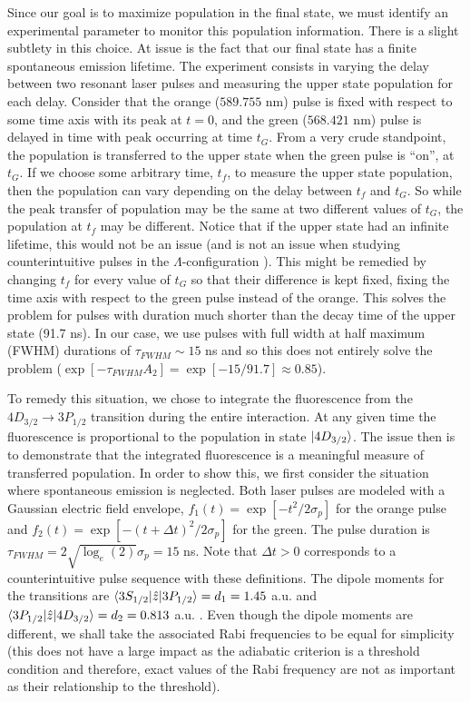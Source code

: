 Since our goal is to maximize population in the final state, we must identify
an experimental parameter to monitor this population information.  There
is a slight subtlety in this choice.  At issue is the fact that our
final state has a finite spontaneous emission lifetime.  The experiment consists
in varying the delay between two resonant laser pulses and measuring the upper
state population for each delay.  Consider that the orange
($589.755$ nm) pulse is fixed with respect to some time axis with its peak at
$t=0$, and the green ($568.421$ nm) pulse is delayed in time with peak occurring
at time $t_G$.  From a very crude standpoint, the population is transferred
to the upper state when the green pulse is ``on'', at $t_G$.  If we choose some
arbitrary time, $t_f$, to measure the upper state population, then
the population can vary depending on the delay between $t_f$ and $t_G$.  So
while the peak transfer of population may be the same at two different values
of $t_G$, the population at $t_f$ may be different.  Notice that if the upper
state had an infinite lifetime, this would not be an issue (and is not an issue
when studying counterintuitive pulses in the $\Lambda$-configuration
\cite{He:90}).  This might be remedied by changing $t_f$ for every value of
$t_G$ so that their difference is kept fixed, fixing the time axis with respect
to the green pulse instead of the orange.  This solves the problem for pulses
with duration much shorter than the decay time of the upper state (91.7 ns).  In
our case, we use pulses with full width at half maximum (FWHM) durations of
$\tau_{\scriptscriptstyle \!F\!W\!H\!M}
\sim 15$ ns and so this does not entirely solve the problem
($\exp[-\tau_{\scriptscriptstyle \!F\!W\!H\!M}A_2] =
\exp[-15/91.7] \approx 0.85$).

To remedy this situation, we chose to integrate the fluorescence from the
$4D_{3/2} \rightarrow 3P_{1/2}$ transition during the entire interaction.  At
any given time the fluorescence is proportional to the population in state
$\vert 4D_{3/2} \rangle$.  The issue then is to demonstrate that the
integrated fluorescence is a meaningful measure of transferred
population.  In order to show this, we first consider the situation where
spontaneous emission is neglected.  Both laser pulses are modeled with a
Gaussian electric field envelope, $f_1(t) = \exp\left[-t^2/2\sigma_p\right]$
for the orange pulse and $f_2(t) = \exp\left[-(t+\Delta
t)^2/2\sigma_p\right]$ for the green. The pulse duration is $\tau_{
\scriptscriptstyle \!F\!W\!H\!M} = 2
\sqrt{\log_e(2)} \sigma_p = 15$ ns.  Note that $\Delta t > 0$ corresponds to a
counterintuitive pulse sequence with these definitions.  The dipole moments
for the transitions are $\langle 3S_{1/2} \vert\hat{z}\vert 3P_{1/2} \rangle = d_1 = 1.45$
a.u. and $\langle 3P_{1/2} \vert\hat{z}\vert 4D_{3/2} \rangle = d_2 = 0.813$ a.u.
\cite{Wiese:69}.  Even though the dipole moments are different, we
shall take the associated Rabi frequencies to be equal for simplicity (this does
not have a large impact as the adiabatic criterion is a threshold condition and
therefore, exact values of the Rabi frequency are not as important as their
relationship to the threshold).

